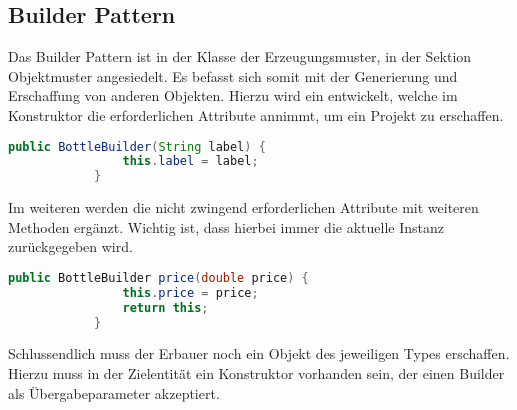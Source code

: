 		\subsection{Builder Pattern}
		Das Builder Pattern ist in der Klasse der Erzeugungsmuster, in der Sektion Objektmuster angesiedelt. Es befasst sich somit mit der Generierung und Erschaffung von anderen Objekten. Hierzu wird ein  entwickelt, welche im Konstruktor die erforderlichen Attribute annimmt, um ein Projekt zu erschaffen. 
		\begin{lstlisting}[language=java,caption={Beispiel eines Konstruktors des BottleBuildes},gobble=11]
			public BottleBuilder(String label) {
				this.label = label;
			}
		\end{lstlisting}
		Im weiteren werden die nicht zwingend erforderlichen Attribute mit weiteren Methoden ergänzt. Wichtig ist, dass hierbei immer die aktuelle Instanz zurückgegeben wird.
		\begin{lstlisting}[language=java,caption={Beispiel einer Builder Konstruktor Methode},gobble=11]
			public BottleBuilder price(double price) {
				this.price = price;
				return this;
			}
		\end{lstlisting}
		Schlussendlich muss der Erbauer noch ein Objekt des jeweiligen Types erschaffen. Hierzu muss in der Zielentität ein Konstruktor vorhanden sein, der einen Builder als Übergabeparameter akzeptiert. 
		
		\newpage
		
